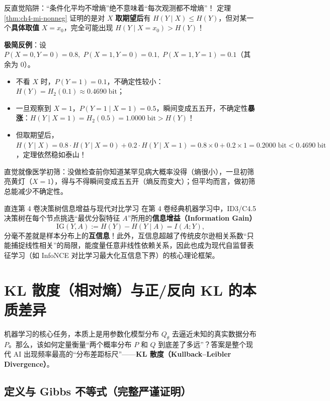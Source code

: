 \begin{failBox}{反直觉陷阱：“条件化平均不增熵”绝不意味着“每次观测都不增熵”！}
定理 \ref{thm:ch4-mi-nonneg} 证明的是对 $X$ \textbf{取期望后}有 $H(Y\mid X) \le H(Y)$，但对某一个\textbf{具体取值} $X = x_0$，完全可能出现 $H(Y \mid X = x_0) > H(Y)$！

\textbf{极简反例}：设 $P(X=0, Y=0) = 0.8,\; P(X=1, Y=0) = 0.1,\; P(X=1, Y=1) = 0.1$（其余为 $0$）。
\begin{itemize}
  \item 不看 $X$ 时，$P(Y=1) = 0.1$，不确定性较小：$H(Y) = H_2(0.1) \approx 0.4690\;\text{bit}$；
  \item 一旦观察到 $X = 1$，$P(Y=1 \mid X=1) = 0.5$，瞬间变成五五开，不确定性\textbf{暴涨}：$H(Y \mid X=1) = H_2(0.5) = 1.0000\;\text{bit} > H(Y)$！
  \item 但取期望后，$H(Y \mid X) = 0.8 \cdot H(Y\mid X=0) + 0.2 \cdot H(Y\mid X=1) = 0.8\times 0 + 0.2\times 1 = 0.2000\;\text{bit} < 0.4690\;\text{bit}$，定理依然稳如泰山！
\end{itemize}
直觉就像医学初筛：没做检查前你知道某罕见病大概率没得（熵很小），一旦初筛亮黄灯（$X=1$），得与不得瞬间变成五五开（熵反而变大）；但平均而言，做初筛总能减少不确定性。
\end{failBox}

\begin{insightBox}{直连第 4 卷决策树信息增益与现代对比学习}
在第 4 卷经典机器学习中，ID3/C4.5 决策树在每个节点挑选“最优分裂特征 $A$”所用的\textbf{信息增益（Information Gain）}
\[
  \mathrm{IG}(Y, A) := H(Y) - H(Y \mid A) = I(A; Y),
\]
分毫不差就是样本分布上的\textbf{互信息}！此外，互信息超越了传统皮尔逊相关系数“只能捕捉线性相关”的局限，能度量任意非线性依赖关系，因此也成为现代自监督表征学习（如 InfoNCE 对比学习最大化互信息下界）的核心理论框架。
\end{insightBox}

\section{KL 散度（相对熵）与正/反向 KL 的本质差异}
\label{sec:ch4-kl}

机器学习的核心任务，本质上是用参数化模型分布 $Q_\theta$ 去逼近未知的真实数据分布 $P$。那么，该如何定量衡量“两个概率分布 $P$ 和 $Q$ 到底差了多远”？答案是整个现代 AI 出现频率最高的“分布差距标尺”——\textbf{KL 散度（Kullback--Leibler Divergence）}。

\subsection{定义与 Gibbs 不等式（完整严谨证明）}

